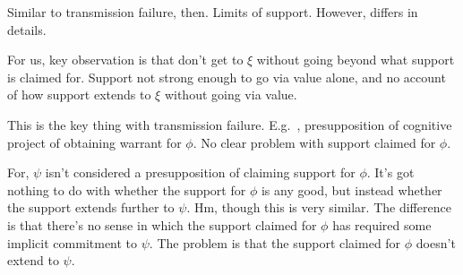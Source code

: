 \begin{note}
  Similar to transmission failure, then.
  Limits of support.
  However, differs in details.

  For us, key observation is that don't get to \(\xi\) without going beyond what support is claimed for.
  Support not strong enough to go via value alone, and no account of how support extends to \(\xi\) without going via value.

  This is the key thing with transmission failure.
  E.g.\ \citeauthor{Wright:2011wn}, presupposition of cognitive project of obtaining warrant for \(\phi\).
  No clear problem with support claimed for \(\phi\).

  For, \(\psi\) isn't considered a presupposition of claiming support for \(\phi\).
  It's got nothing to do with whether the support for \(\phi\) is any good, but instead whether the support extends further to \(\psi\).
  Hm, though this is very similar.
  The difference is that there's no sense in which the support claimed for \(\phi\) has required some implicit commitment to \(\psi\).
  The problem is that the support claimed for \(\phi\) doesn't extend to \(\psi\).
\end{note}

